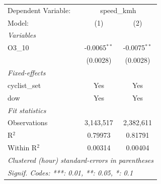 \begingroup
\centering
\begin{tabular}{lcc}
   \tabularnewline \midrule \midrule
   Dependent Variable: & \multicolumn{2}{c}{speed\_kmh}\\
   Model:        & (1)            & (2)\\  
   \midrule
   \emph{Variables}\\
   O3\_10        & -0.0065$^{**}$ & -0.0075$^{**}$\\   
                 & (0.0028)       & (0.0028)\\   
   \midrule
   \emph{Fixed-effects}\\
   cyclist\_set  & Yes            & Yes\\  
   dow           & Yes            & Yes\\  
   \midrule
   \emph{Fit statistics}\\
   Observations  & 3,143,517      & 2,382,611\\  
   R$^2$         & 0.79973        & 0.81791\\  
   Within R$^2$  & 0.00314        & 0.00404\\  
   \midrule \midrule
   \multicolumn{3}{l}{\emph{Clustered (hour) standard-errors in parentheses}}\\
   \multicolumn{3}{l}{\emph{Signif. Codes: ***: 0.01, **: 0.05, *: 0.1}}\\
\end{tabular}
\par\endgroup
